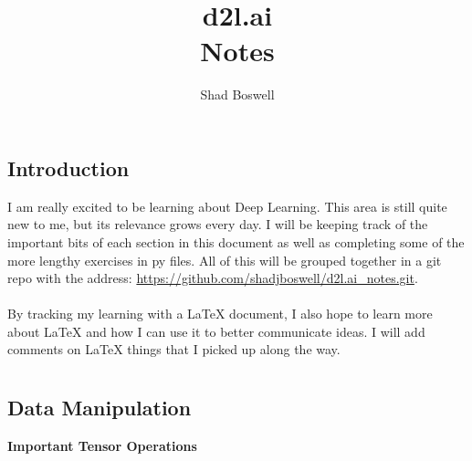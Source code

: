 \documentclass{report}
\title{\Huge{d2l.ai}\\Notes}
\author{\huge{Shad Boswell}}
\date{}
\begin{document}
\maketitle
\newpage%
\tableofcontents
\pagebreak

\chapter{}
\section{Introduction}
I am really excited to be learning about Deep Learning. This area is still quite new to me, but its relevance grows every day. I will be keeping track of the important bits of each section in this document as well as completing some of the more lengthy exercises in py files. All of this will be grouped together in a git repo with the address: 
\url{https://github.com/shadjboswell/d2l.ai_notes.git}. 
\\
\\
\noindent By tracking my learning with a LaTeX document, I also hope to learn more about LaTeX and how I can use it to better communicate ideas. I will add comments on LaTeX things that I picked up along the way. 

\chapter{}
\section{Data Manipulation}
\dfn{Tensors}{Tensors are the primary unit of Deep Learning. They are used because of the versatility and ease of use. They come from the PyTorch library and can be used by calling: 
   \\ import torch \\
Documentation can be found here: \url{https://pytorch.org/docs/stable/tensors.html}
}

\noindent \textbf{\Large Important Tensor Operations}
\\
\\

\\
\end{document}
